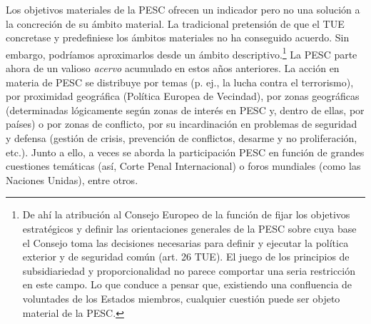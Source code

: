 \documentclass[10pt,a4paper]{article}
\begin{document}
Los objetivos materiales de la PESC ofrecen un indicador pero no una solución a la concreción de su ámbito material. La tradicional pretensión de que el TUE concretase y predefiniese los ámbitos materiales no ha conseguido acuerdo. Sin embargo, podríamos aproximarlos desde un ámbito descriptivo.\footnote{%
    De ahí la atribución al Consejo Europeo de la función de fijar los objetivos estratégicos y definir las orientaciones generales de la PESC sobre cuya base el Consejo toma las decisiones necesarias para definir y ejecutar la política exterior y de seguridad común (art. 26 TUE). El juego de los principios de subsidiariedad y proporcionalidad no parece comportar una seria restricción en este campo. Lo que conduce a pensar que, existiendo una confluencia de voluntades de los Estados miembros, cualquier cuestión puede ser objeto material de la PESC.
} La PESC parte ahora de un valioso \textit{acervo} acumulado en estos años anteriores. La acción en materia de PESC se distribuye por temas (p. ej., la lucha contra el terrorismo), por proximidad geográfica (Política Europea de Vecindad), por zonas geográficas (determinadas lógicamente según zonas de interés en PESC y, dentro de ellas, por países) o por zonas de conflicto, por su incardinación en problemas de seguridad y defensa (gestión de crisis, prevención de conflictos, desarme y no proliferación, etc.). Junto a ello, a veces se aborda la participación PESC en función de grandes cuestiones temáticas (así, Corte Penal Internacional) o foros mundiales (como las Naciones Unidas), entre otros.
\end{document}
